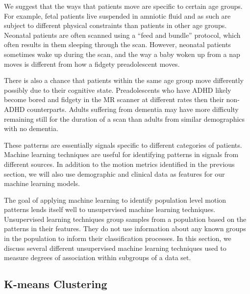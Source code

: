 
We suggest that the ways that patients move are specific to certain age groups. For example, fetal patients live suspended in amniotic fluid and as such are subject to different physical constraints than patients in other age groups. Neonatal patients are often scanned using a ``feed and bundle'' protocol, which often results in them sleeping through the scan. However, neonatal patients sometimes wake up during the scan, and the way a baby woken up from a nap moves is different from how a fidgety preadolescent moves. %

There is also a chance that patients within the same age group move differently possibly due to their cognitive state. Preadolescents who have ADHD likely become bored and fidgety in the MR scanner at different rates then their non-ADHD counterparts. Adults suffering from dementia may have more difficulty remaining still for the duration of a scan than adults from similar demographics with no dementia.

These patterns are essentially signals specific to different categories of patients. Machine learning techniques are useful for identifying patterns in signals from different sources. In addition to the motion metrics identified in the previous section, we will also use demographic and clinical data as features for our machine learning models. 

The goal of applying machine learning to identify population level motion patterns lends itself well to unsupervised machine learning techniques. Unsupervised learning techniques group samples from a population based on the patterns in their features. They do not use information about any known groups in the population to inform their classification processes. In this section, we discuss several different unsupervised machine learning techniques used to measure degrees of association within subgroups of a data set.

\subsection{K-means Clustering}

